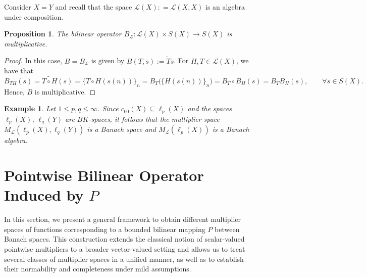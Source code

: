 \documentclass[14pt, a4paper]{article}  %
\providecommand{\pare}[1]{\left( #1\right) }
\newtheorem{proposition}{Proposition}[section]
\newtheorem{example}{Example}[section]  %
\begin{document}
		Consider $X=Y$ and recall that the space $\mathcal{L}(X): = \mathcal{L}(X,X)$ is an algebra under composition. 
	\begin{proposition}
		The bilinear operator $B_{\mathcal{L}}:\mathcal{L}(X)\times S(X)\to S(X)$ is multiplicative.
	\end{proposition}
	\begin{proof} In this case, $B= B_{\mathcal{L}}$ is given by $B(T,s):=\widetilde{T}s$.
		For $H, T\in \mathcal{L}(X)$, we have that
		\begin{equation}
			B_{TH}(s) = \widetilde{T\circ H}(s) = \{T\circ H(s(n))\}_{n}
			=B_{T}\big(\{H(s(n))\}_{n}\big) = B_{T}\circ B_{H}(s)=B_{T} B_{H}(s), \qquad \forall s\in S(X).
		\end{equation}
		Hence, $B$ is multiplicative.
	\end{proof}

	\begin{example}
		Let $1 \leq p,q \leq \infty$. Since $c_{00}(X)\subseteq \ell_{p}(X)$ and the spaces $\ell_{p}(X)$, $\ell_{q}(Y)$ are $BK$-spaces, it follows that the multiplier space $M_{\mathcal{L}}(\ell_{p}(X),\ell_{q}(Y))$ is a Banach space and $M_\mathcal{L} \pare{\ell_p (X)}$ is a Banach algebra.
	\end{example}
	
	 

	

 
	\section{Pointwise Bilinear Operator Induced by $P$}\label{holadenuevo}\label{pop4}
	
	In this section, we present a general framework to obtain different multiplier spaces of functions corresponding to  a bounded bilinear mapping $P$ between Banach spaces. This construction extends the classical notion of scalar-valued pointwise multipliers to a broader vector-valued setting and allows us to  treat several   classes of multiplier spaces in a unified manner, as well as to establish their normability and completeness under mild assumptions.\\
	
\end{document}
